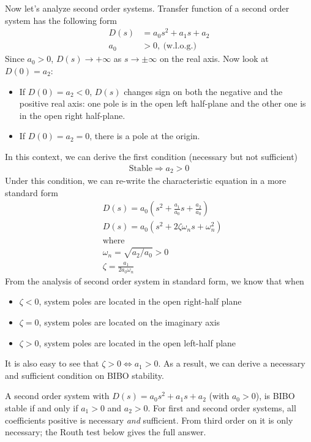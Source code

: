 \documentclass[twoside]{article}
\begin{document}
Now let's analyze second order systems. Transfer function
of a second order system has the following form
%
\begin{align*}
  D(s) &= a_0 s^2 + a_1 s + a_2\\
 a_0 &> 0 , \ \text{(w.l.o.g.)}
\end{align*}
%
Since $a_0 > 0$, $D(s) \to +\infty$ as $s \to \pm\infty$ on the real axis. Now look at
$D(0) = a_2$:
%
\begin{itemize}
     \item If $D(0) = a_2 < 0$, $D(s)$ changes sign on both the negative and the positive real
       axis: one pole is in the open left half-plane and the other one is in the open right
       half-plane.
     \item If $D(0) = a_2 = 0$, there is a pole at the origin.
\end{itemize}
%
In this context, we can derive the first condition (necessary but not
sufficient) 
%
\begin{align*}
 \mathrm{Stable} \Rightarrow a_2 > 0 
\end{align*}
%
Under this condition, we can re-write the characteristic
equation in a more standard form
%
\begin{align*}
  &D(s) = a_0 \left( s^2 + \frac{a_1}{a_0} s + \frac{a_2}{a_0} \right)
  \\
  &D(s) = a_0 \left( s^2 + 2 \zeta \omega_n s + \omega_n^2 \right)
  \\
  &\mathrm{where}
\\
 &\omega_n = \sqrt{a_2 / a_0} > 0 
\\
  &\zeta = \frac{a_1}{2 a_0 \omega_n} 
\end{align*}
%
From the analysis of second order system in standard form,
we know that when 
%
\begin{itemize}
  \item $\zeta < 0$, system poles are located in the open right-half
    plane
  \item $\zeta = 0$, system poles are located on the imaginary axis
  \item $\zeta > 0$, system poles are located in the open left-half
    plane
\end{itemize}
%
It is also easy to see that $\zeta > 0 \Leftrightarrow a_1 > 0$. 
As a result, we can derive a necessary and sufficient condition on
BIBO stability. 

A second order system with $D(s) = a_0 s^2 + a_1 s + a_2$ (with $a_0 >
0$), is BIBO stable if and only if $a_1 > 0$ and $a_2 > 0$. For first and second order
systems, all coefficients positive is necessary \emph{and} sufficient. From third order on it
is only necessary; the Routh test below gives the full answer.
\end{document}
